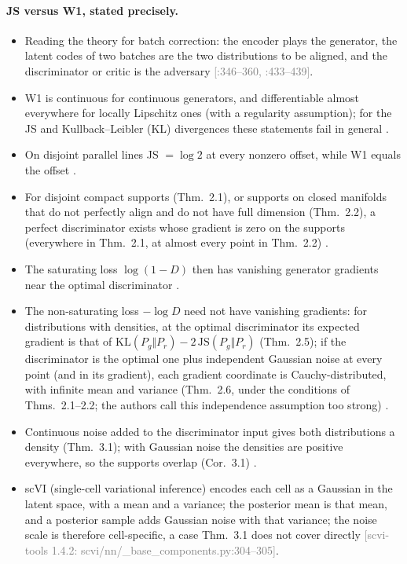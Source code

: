 \documentclass[11pt]{article}
\newcommand{\src}[1]{{\scriptsize\textcolor{gray}{[#1]}}}
\begin{document}
\paragraph{JS versus W1, stated precisely.}
\begin{itemize}
\item Reading the theory for batch correction: the encoder plays the generator, the latent codes of two batches are the two distributions to be aligned, and the discriminator or critic is the adversary \src{:346--360, :433--439}.
\item W1 is continuous for continuous generators, and differentiable almost everywhere for locally Lipschitz ones (with a regularity assumption); for the JS and Kullback--Leibler (KL) divergences these statements fail in general \citep[Thm.~1]{arjovsky2017wasserstein}.
\item On disjoint parallel lines JS $=\log 2$ at every nonzero offset, while W1 equals the offset \citep[Example~1]{arjovsky2017wasserstein}.
\item For disjoint compact supports (Thm.~2.1), or supports on closed manifolds that do not perfectly align and do not have full dimension (Thm.~2.2), a perfect discriminator exists whose gradient is zero on the supports (everywhere in Thm.~2.1, at almost every point in Thm.~2.2) \citep[Thms.~2.1--2.2]{arjovsky2017towards}.
\item The saturating loss $\log(1-D)$ then has vanishing generator gradients near the optimal discriminator \citep[Thm.~2.4]{arjovsky2017towards}.
\item The non-saturating loss $-\log D$ need not have vanishing gradients: for distributions with densities, at the optimal discriminator its expected gradient is that of $\mathrm{KL}(P_g\Vert P_r)-2\,\mathrm{JS}(P_g\Vert P_r)$ (Thm.~2.5); if the discriminator is the optimal one plus independent Gaussian noise at every point (and in its gradient), each gradient coordinate is Cauchy-distributed, with infinite mean and variance (Thm.~2.6, under the conditions of Thms.~2.1--2.2; the authors call this independence assumption too strong) \citep[Sec.~2.2.2]{arjovsky2017towards}.
\item Continuous noise added to the discriminator input gives both distributions a density (Thm.~3.1); with Gaussian noise the densities are positive everywhere, so the supports overlap (Cor.~3.1) \citep{arjovsky2017towards}.
\item scVI (single-cell variational inference) encodes each cell as a Gaussian in the latent space, with a mean and a variance; the posterior mean is that mean, and a posterior sample adds Gaussian noise with that variance; the noise scale is therefore cell-specific, a case Thm.~3.1 does not cover directly \src{scvi-tools 1.4.2: scvi/nn/\_base\_components.py:304--305}.

\end{itemize}
\end{document}

